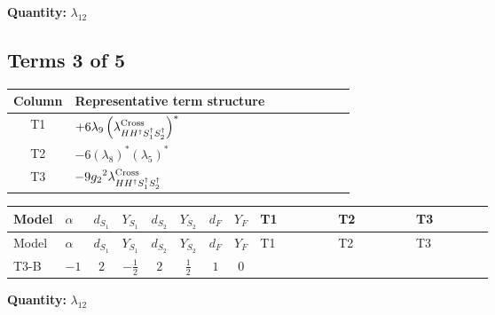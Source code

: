 \documentclass[8pt]{article}
\begin{document}
\begin{landscape}
\begin{longtable}{@{}llcccccc >{\raggedright\arraybackslash}p{0.21\linewidth} >{\raggedright\arraybackslash}p{0.21\linewidth} >{\raggedright\arraybackslash}p{0.21\linewidth}@{}}
\midrule
\bottomrule
\end{longtable}
\clearpage
\noindent\textbf{Quantity: }$\lambda_{12}$\par\smallskip
\subsection*{Terms 3 of 5}
\begin{center}
\begin{tabular}{@{}c >{\raggedright\arraybackslash}p{0.82\linewidth}@{}}
\toprule
Column & Representative term structure \\
\midrule
T1 & \(\displaystyle +6 {\lambda_{9}} \left({\lambda_{H H^\dagger S_1^\dagger S_2^\dagger}^{\rm Cross}}\right)^{*}\) \\
\midrule
T2 & \(\displaystyle -6 \left({\lambda_{8}}\right)^{*} \left({\lambda_5}\right)^{*}\) \\
\midrule
T3 & \(\displaystyle -9 {g_2}^2 {\lambda_{H H^\dagger S_1^\dagger S_2^\dagger}^{\rm Cross}}\) \\
\midrule
\bottomrule
\end{tabular}
\end{center}
\smallskip
\tiny
\begin{longtable}{@{}llcccccc >{\raggedright\arraybackslash}p{0.21\linewidth} >{\raggedright\arraybackslash}p{0.21\linewidth} >{\raggedright\arraybackslash}p{0.21\linewidth}@{}}
\toprule
Model & $\alpha$ & $d_{S_1}$ & $Y_{S_1}$ & $d_{S_2}$ & $Y_{S_2}$ & $d_F$ & $Y_F$ & T1 & T2 & T3 \\
\midrule
\endfirsthead
\toprule
Model & $\alpha$ & $d_{S_1}$ & $Y_{S_1}$ & $d_{S_2}$ & $Y_{S_2}$ & $d_F$ & $Y_F$ & T1 & T2 & T3 \\
\midrule
\endhead
T3-B & $-1$ & $2$ & $-\frac{1}{2}$ & $2$ & $\frac{1}{2}$ & $1$ & $0$ & \scriptsize\adjustbox{max width=\linewidth}{$\begin{gathered} +6 {\lambda_{9}} \left({\lambda_{H H^\dagger S_1^\dagger S_2^\dagger}^{\rm Cross}}\right)^{*}\end{gathered}$} & \scriptsize\adjustbox{max width=\linewidth}{$\begin{gathered} -6 \left({\lambda_{8}}\right)^{*} \left({\lambda_5}\right)^{*}\end{gathered}$} & \scriptsize\adjustbox{max width=\linewidth}{$\begin{gathered} -9 {g_2}^2 {\lambda_{H H^\dagger S_1^\dagger S_2^\dagger}^{\rm Cross}}\end{gathered}$} \\
\midrule
\bottomrule
\end{longtable}
\clearpage
\noindent\textbf{Quantity: }$\lambda_{12}$\par\smallskip

\end{landscape}
\end{document}
